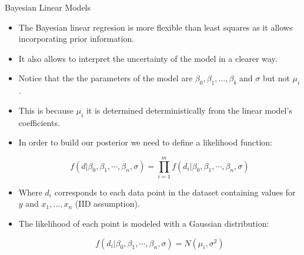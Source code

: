 \documentclass[handout]{beamer}
\begin{document}
\begin{frame}{Bayesian Linear Models}
\scriptsize{
\begin{itemize}


\item The Bayesian linear regresion is  more flexible than least squares as it allows incorporating prior information.

\item It also allows to interpret the uncertainty of the model in a clearer way.

\item Notice that the the parameters of the model are $\beta_0,\beta_1,\dots,\beta_b$ and $\sigma$ but not $\mu_i$.

\item This is because $\mu_i$ it is determined deterministically from the linear model's coefficients.

\item In order to build our posterior we need to define a likelihood function:

\begin{displaymath}
 f(d|\beta_0,\beta_1,\cdots,\beta_n,\sigma) =\prod_{i=1}^m f(d_i|\beta_0,\beta_1,\cdots,\beta_n,\sigma) 
\end{displaymath}


\item Where $d_i$ corresponds to each data point in the dataset containing values for $y$ and $x_1,\dots,x_n$ (IID assumption).

\item The likelihood of each point is modeled with a Gaussian distribution:

\begin{displaymath}
 f(d_i|\beta_0,\beta_1,\cdots,\beta_n,\sigma)= N(\mu_i, \sigma^2)
\end{displaymath}



 
\end{itemize}



} 

\end{frame}
\end{document}
